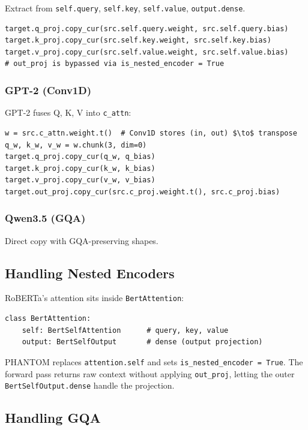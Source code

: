 Extract from \texttt{self.query}, \texttt{self.key}, \texttt{self.value}, \texttt{output.dense}.

\begin{lstlisting}
target.q_proj.copy_cur(src.self.query.weight, src.self.query.bias)
target.k_proj.copy_cur(src.self.key.weight, src.self.key.bias)
target.v_proj.copy_cur(src.self.value.weight, src.self.value.bias)
# out_proj is bypassed via is_nested_encoder = True
\end{lstlisting}

\subsubsection{GPT-2 (Conv1D)}

GPT-2 fuses Q, K, V into \texttt{c\_attn}:

\begin{lstlisting}
w = src.c_attn.weight.t()  # Conv1D stores (in, out) $\to$ transpose
q_w, k_w, v_w = w.chunk(3, dim=0)
target.q_proj.copy_cur(q_w, q_bias)
target.k_proj.copy_cur(k_w, k_bias)
target.v_proj.copy_cur(v_w, v_bias)
target.out_proj.copy_cur(src.c_proj.weight.t(), src.c_proj.bias)
\end{lstlisting}

\subsubsection{Qwen3.5 (GQA)}

Direct copy with GQA-preserving shapes.

\subsection{Handling Nested Encoders}

RoBERTa's attention sits inside \texttt{BertAttention}:

\begin{lstlisting}
class BertAttention:
    self: BertSelfAttention      # query, key, value
    output: BertSelfOutput       # dense (output projection)
\end{lstlisting}

PHANTOM replaces \texttt{attention.self} and sets \texttt{is\_nested\_encoder = True}. The 
forward pass returns raw context without applying \texttt{out\_proj}, letting the 
outer \texttt{BertSelfOutput.dense} handle the projection.

\subsection{Handling GQA}

